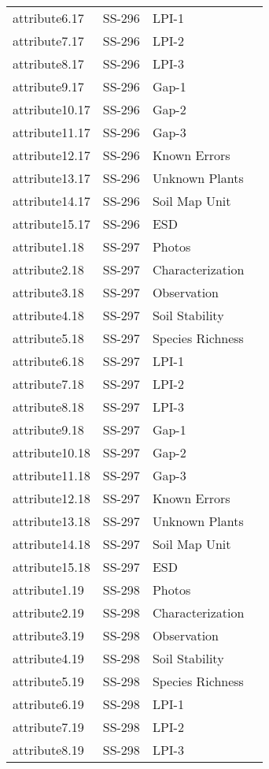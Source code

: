 \documentclass[
]{article}
\begin{document}
\begin{longtable}[]{@{}llll@{}}
attribute6.17 & SS-296 & LPI-1 & \\
attribute7.17 & SS-296 & LPI-2 & \\
attribute8.17 & SS-296 & LPI-3 & \\
attribute9.17 & SS-296 & Gap-1 & \\
attribute10.17 & SS-296 & Gap-2 & \\
attribute11.17 & SS-296 & Gap-3 & \\
attribute12.17 & SS-296 & Known Errors & \\
attribute13.17 & SS-296 & Unknown Plants & \\
attribute14.17 & SS-296 & Soil Map Unit & \\
attribute15.17 & SS-296 & ESD & \\
attribute1.18 & SS-297 & Photos & \\
attribute2.18 & SS-297 & Characterization & \\
attribute3.18 & SS-297 & Observation & \\
attribute4.18 & SS-297 & Soil Stability & \\
attribute5.18 & SS-297 & Species Richness & \\
attribute6.18 & SS-297 & LPI-1 & \\
attribute7.18 & SS-297 & LPI-2 & \\
attribute8.18 & SS-297 & LPI-3 & \\
attribute9.18 & SS-297 & Gap-1 & \\
attribute10.18 & SS-297 & Gap-2 & \\
attribute11.18 & SS-297 & Gap-3 & \\
attribute12.18 & SS-297 & Known Errors & \\
attribute13.18 & SS-297 & Unknown Plants & \\
attribute14.18 & SS-297 & Soil Map Unit & \\
attribute15.18 & SS-297 & ESD & \\
attribute1.19 & SS-298 & Photos & \\
attribute2.19 & SS-298 & Characterization & \\
attribute3.19 & SS-298 & Observation & \\
attribute4.19 & SS-298 & Soil Stability & \\
attribute5.19 & SS-298 & Species Richness & \\
attribute6.19 & SS-298 & LPI-1 & \\
attribute7.19 & SS-298 & LPI-2 & \\
attribute8.19 & SS-298 & LPI-3 & \\

\end{longtable}
\end{document}
